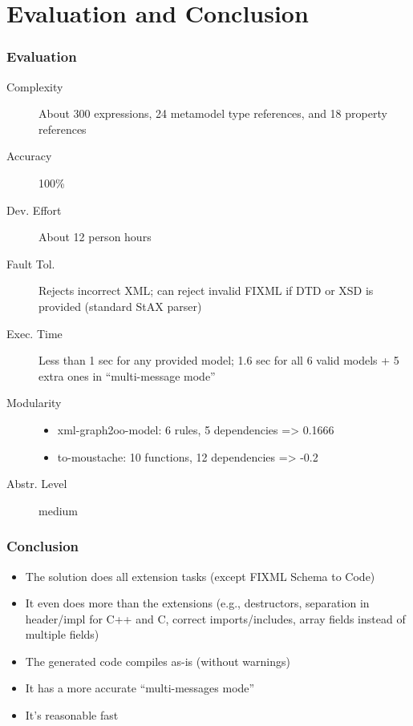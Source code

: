 \documentclass{beamer}
\begin{document}
\section{Evaluation and Conclusion}

\begin{frame}
  \frametitle{Evaluation}
  \begin{description}
  \item[Complexity] About 300 expressions, 24 metamodel type references, and 18
    property references
  \item[Accuracy] 100\%
  \item[Dev. Effort] About 12 person hours
  \item[Fault Tol.] Rejects incorrect XML; can reject invalid FIXML if DTD or
    XSD is provided (standard StAX parser)
  \item[Exec. Time] Less than 1 sec for any provided model; 1.6 sec for all 6
    valid models + 5 extra ones in ``multi-message mode''
  \item[Modularity]
    \begin{itemize}
    \item xml-graph2oo-model: 6 rules, 5 dependencies => 0.1666
    \item to-moustache: 10 functions, 12 dependencies => -0.2
    \end{itemize}
  \item[Abstr. Level] medium
  \end{description}
\end{frame}

\begin{frame}
  \frametitle{Conclusion}
  \begin{itemize}
  \item The solution does all extension tasks (except FIXML Schema to Code)
  \item It even does more than the extensions (e.g., destructors, separation in
    header/impl for C++ and C, correct imports/includes, array fields instead
    of multiple fields)
  \item The generated code compiles as-is (without warnings)
  \item It has a more accurate ``multi-messages mode''
  \item It's reasonable fast
  \end{itemize}
\end{frame}
\end{document}
